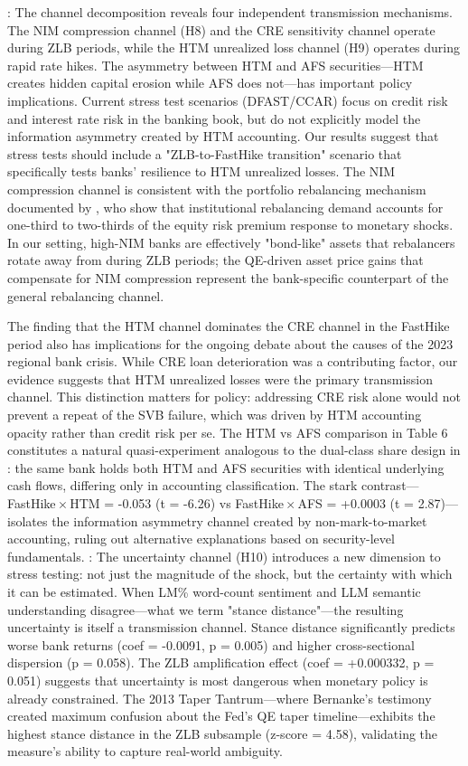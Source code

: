 \documentclass[12pt,a4paper]{article}
\begin{document}
: The channel decomposition reveals four independent transmission mechanisms. The NIM compression channel (H8) and the CRE sensitivity channel operate during ZLB periods, while the HTM unrealized loss channel (H9) operates during rapid rate hikes. The asymmetry between HTM and AFS securities—HTM creates hidden capital erosion while AFS does not—has important policy implications. Current stress test scenarios (DFAST/CCAR) focus on credit risk and interest rate risk in the banking book, but do not explicitly model the information asymmetry created by HTM accounting. Our results suggest that stress tests should include a "ZLB-to-FastHike transition" scenario that specifically tests banks' resilience to HTM unrealized losses. The NIM compression channel is consistent with the portfolio rebalancing mechanism documented by \citet{LuWu2024}, who show that institutional rebalancing demand accounts for one-third to two-thirds of the equity risk premium response to monetary shocks. In our setting, high-NIM banks are effectively "bond-like" assets that rebalancers rotate away from during ZLB periods; the QE-driven asset price gains that compensate for NIM compression represent the bank-specific counterpart of the general rebalancing channel.

The finding that the HTM channel dominates the CRE channel in the FastHike period also has implications for the ongoing debate about the causes of the 2023 regional bank crisis. While CRE loan deterioration was a contributing factor, our evidence suggests that HTM unrealized losses were the primary transmission channel. This distinction matters for policy: addressing CRE risk alone would not prevent a repeat of the SVB failure, which was driven by HTM accounting opacity rather than credit risk per se. The HTM vs AFS comparison in Table 6 constitutes a natural quasi-experiment analogous to the dual-class share design in \citet{LuWu2024}: the same bank holds both HTM and AFS securities with identical underlying cash flows, differing only in accounting classification. The stark contrast—FastHike\,$\times$\,HTM = -0.053 (t = -6.26) vs FastHike\,$\times$\,AFS = +0.0003 (t = 2.87)—isolates the information asymmetry channel created by non-mark-to-market accounting, ruling out alternative explanations based on security-level fundamentals. : The uncertainty channel (H10) introduces a new dimension to stress testing: not just the magnitude of the shock, but the certainty with which it can be estimated. When LM\% word-count sentiment and LLM semantic understanding disagree—what we term "stance distance"—the resulting uncertainty is itself a transmission channel. Stance distance significantly predicts worse bank returns (coef = -0.0091, p = 0.005) and higher cross-sectional dispersion (p = 0.058). The ZLB amplification effect (coef = +0.000332, p = 0.051) suggests that uncertainty is most dangerous when monetary policy is already constrained. The 2013 Taper Tantrum—where Bernanke's testimony created maximum confusion about the Fed's QE taper timeline—exhibits the highest stance distance in the ZLB subsample (z-score = 4.58), validating the measure's ability to capture real-world ambiguity.
\end{document}
